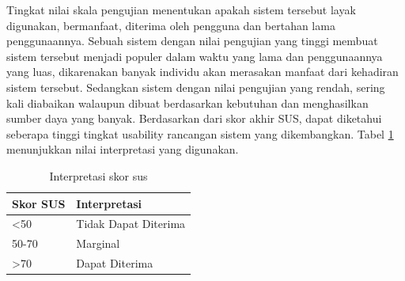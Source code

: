 \par Tingkat nilai skala pengujian menentukan apakah sistem tersebut layak digunakan, bermanfaat, diterima oleh pengguna dan bertahan lama penggunaannya. Sebuah sistem dengan nilai pengujian yang tinggi membuat sistem tersebut menjadi populer dalam waktu yang lama dan penggunaannya yang luas, dikarenakan banyak individu akan merasakan manfaat dari kehadiran sistem tersebut. Sedangkan sistem dengan nilai pengujian yang rendah, sering kali diabaikan walaupun dibuat berdasarkan kebutuhan dan menghasilkan sumber daya yang banyak.
Berdasarkan dari skor akhir SUS, dapat diketahui seberapa tinggi tingkat usability rancangan sistem yang dikembangkan. Tabel \ref{tab:skor_SUS} menunjukkan nilai interpretasi yang digunakan.

\begin{table}[H]
\caption{ Interpretasi skor sus}
\label{tab:skor_SUS}
\centering
\begin{tabular}{|l|l|}
\hline
Skor SUS         & Interpretasi         \\ \hline
\textless{}50    & Tidak Dapat Diterima \\ \hline
50-70            & Marginal             \\ \hline
\textgreater{}70 & Dapat Diterima       \\ \hline
\end{tabular}
\end{table}

